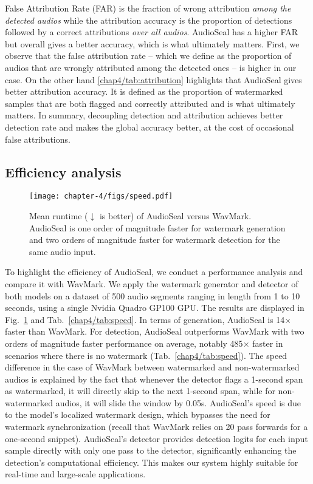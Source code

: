 False Attribution Rate (FAR) is the fraction of wrong attribution \emph{among the detected audios} while the attribution accuracy is the proportion of detections followed by a correct attributions \emph{over all audios}. 
AudioSeal has a higher FAR but overall gives a better accuracy, which is what ultimately matters.
First, we observe that the false attribution rate -- which we define as the proportion of audios that are wrongly attributed among the detected ones -- is higher in our case.
On the other hand \autoref{chap4/tab:attribution} highlights that AudioSeal gives better attribution accuracy.
It is defined as the proportion of watermarked samples that are both flagged and correctly attributed and is what ultimately matters.
In summary, decoupling detection and attribution achieves better detection rate and makes the global accuracy better, at the cost of occasional false attributions.



\subsection{Efficiency analysis}
\label{chap4/sec:speed}


\begin{figure}[b!]
    \centering
    \texttt{[image: chapter-4/figs/speed.pdf]}
    \caption{Mean runtime ($\downarrow$ is better) of AudioSeal versus WavMark. 
    AudioSeal is one order of magnitude faster for watermark generation and two orders of magnitude faster for watermark detection for the same audio input.
    }
    \label{chap4/fig:efficiency}
\end{figure}



To highlight the efficiency of AudioSeal, we conduct a performance analysis and compare it with WavMark. 
We apply the watermark generator and detector of both models on a dataset of 500 audio segments ranging in length from 1 to 10 seconds, using a single Nvidia Quadro GP100 GPU. 
The results are displayed in Fig.~\ref{chap4/fig:efficiency} and Tab.~\ref{chap4/tab:speed}.
In terms of generation, AudioSeal is 14$\times$ faster than WavMark. 
For detection, AudioSeal outperforms WavMark with two orders of magnitude faster performance on average, notably 485$\times$ faster in scenarios where there is no watermark (Tab.~\ref{chap4/tab:speed}). 
The speed difference in the case of WavMark between watermarked and non-watermarked audios is explained by the fact that whenever the detector flags a 1-second span as watermarked, it will directly skip to the next 1-second span, while for non-watermarked audios, it will slide the window by 0.05s.
AudioSeal's speed is due to the model's localized watermark design, which bypasses the need for watermark synchronization (recall that WavMark relies on 20 pass forwards for a one-second snippet).
AudioSeal's detector provides detection logits for each input sample directly with only one pass to the detector, significantly enhancing the detection's computational efficiency.
This makes our system highly suitable for real-time and large-scale applications.

